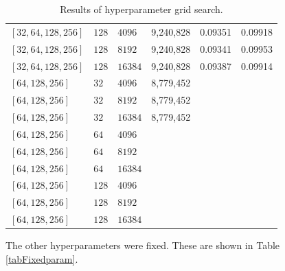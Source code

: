 \begin{table}[H]
\begin{adjustbox}{width=\textwidth}
\begin{tabular}{lll|rrr}
      $[32, 64, 128, 256 ]$& $128$ & $4096$ & 9,240,828 & 0.09351 & 0.09918 \\
      $[32, 64, 128, 256 ]$& $128$ & $8192$ & 9,240,828 & 0.09341 & 0.09953 \\
      $[32, 64, 128, 256 ]$& $128$ & $16384$ & 9,240,828 & 0.09387 & 0.09914 \\[0.5cm]

      

      $[64, 128, 256 ]$& $32$ & $4096$ & 8,779,452  && \\
      $[64, 128, 256 ]$& $32$ & $8192$ & 8,779,452 && \\
      $[64, 128, 256 ]$& $32$ & $16384$ & 8,779,452 && \\[0.1cm]
      
      $[64, 128, 256 ]$& $64$ & $4096$ & && \\
      $[64, 128, 256 ]$& $64$ & $8192$ & && \\
      $[64, 128, 256 ]$& $64$ & $16384$ & && \\[0.1cm]
      
      $[64, 128, 256 ]$& $128$  & $4096$ & && \\
      $[64, 128, 256 ]$& $128$ & $8192$ & && \\
      $[64, 128, 256 ]$& $128$ & $16384$ & && \\

    \end{tabular}
  \end{adjustbox}
  \caption{Results of hyperparameter grid search.}
  \label{tabHyperparam}
\end{table}

The other hyperparameters were fixed. These are shown in Table
\ref{tabFixedparam}.

